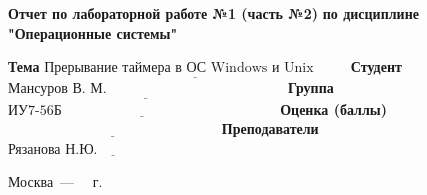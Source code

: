 \begin{titlepage}
	
	\begin{center}
		\Large\textbf{  Отчет по лабораторной работе №1 (часть №2)}\newline
		\textbf{по дисциплине "Операционные системы"}\newline\newline
	\end{center}
	
\noindent\textbf{Тема} $\underline{\text{Прерывание таймера в ОС Windows и Unix~~~~~~~}}$\newline\newline
\noindent\textbf{Студент} $\underline{\text{Мансуров В. М.~~~~~~~~~~~~~~~~~~~~~~~~~~~~~~~~~~~~~~}}$\newline\newline
\noindent\textbf{Группа} $\underline{\text{ИУ7-56Б~~~~~~~~~~~~~~~~~~~~~~~~~~~~~~~~~~~~~~~~~~~~~~}}$\newline\newline
\noindent\textbf{Оценка (баллы)} $\underline{\text{~~~~~~~~~~~~~~~~~~~~~~~~~~~~~~~~~~~~~~~~~~~~~}}$\newline\newline
\noindent\textbf{Преподаватели} $\underline{\text{Рязанова Н.Ю.~~~~~~~~~~~~~~~~~~~~~~~~~~}}$\newline\newline\newline

	
	\begin{center}
		\vfill
		Москва~---~\the\year
		~г.
	\end{center}
	\restoregeometry
\end{titlepage}

